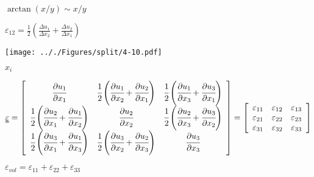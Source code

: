 \documentclass[onecolumn,11pt]{report}
\def\lthtmlcheckvsize{\ifdim\ht\sizebox<\vsize 
  \ifdim\wd\sizebox<\hsize\expandafter\hfill\fi \expandafter\vfill
  \else\expandafter\vss\fi}%
\begin{document}
{\newpage\clearpage
{}%
$ \arctan(x/y) \sim x/y$%
\lthtmlindisplaymathZ
\lthtmlcheckvsize\clearpage}

{\newpage\clearpage
{}%
$\displaystyle \varepsilon_{12} = \frac{1}{2} \left( \frac{\Delta u_1}{\Delta x_2} + \frac{\Delta u_2}{\Delta x_1} \right)$%
\lthtmlindisplaymathZ
\lthtmlcheckvsize\clearpage}

{\newpage\clearpage
{}%
\texttt{[image: .././Figures/split/4-10.pdf]}%
\lthtmlpictureZ
\lthtmlcheckvsize\clearpage}

{\newpage\clearpage
{}%
$ x_i$%
\lthtmlindisplaymathZ
\lthtmlcheckvsize\clearpage}

{\newpage\clearpage
{}%
\begin{displaymath}\uuline{\varepsilon} =
\left[
\begin{array}{ccc}
\cfrac{\partial u_1}{\partial x_1} & \cfrac{1}{2} \left( \cfrac{\partial u_1}{\partial x_2} + \cfrac{\partial u_2}{\partial x_1} \right) &  \cfrac{1}{2} \left( \cfrac{\partial u_1}{\partial x_3} + \cfrac{\partial u_3}{\partial x_1} \right)\\
\cfrac{1}{2} \left( \cfrac{\partial u_2}{\partial x_1} + \cfrac{\partial u_1}{\partial x_2} \right) & \cfrac{\partial u_2}{\partial x_2} & \cfrac{1}{2} \left( \cfrac{\partial u_2}{\partial x_3} + \cfrac{\partial u_3}{\partial x_2} \right)\\
\cfrac{1}{2} \left( \cfrac{\partial u_3}{\partial x_1} + \cfrac{\partial u_1}{\partial x_3} \right) &  \cfrac{1}{2} \left( \cfrac{\partial u_3}{\partial x_2} + \cfrac{\partial u_2}{\partial x_3} \right) & \cfrac{\partial u_3}{\partial x_3}
\end{array}
\right] =
\left[
\begin{array}{ccc}
\varepsilon_{11} & \varepsilon_{12}  &  \varepsilon_{13} \\
\varepsilon_{21} & \varepsilon_{22}  &  \varepsilon_{23} \\
\varepsilon_{31} & \varepsilon_{32}  &  \varepsilon_{33}
\end{array}
\right]\end{displaymath}%
\lthtmldisplayZ
\lthtmlcheckvsize\clearpage}

{\newpage\clearpage
{}%
$\displaystyle \varepsilon_{vol} = \varepsilon_{11} + \varepsilon_{22} + \varepsilon_{33}$%
\lthtmlindisplaymathZ
\lthtmlcheckvsize\clearpage}
\end{document}
